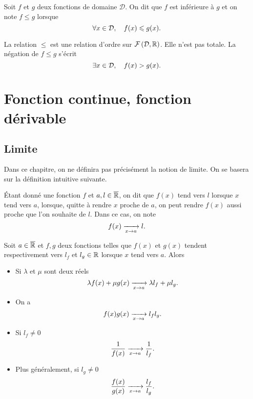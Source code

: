 \documentclass{magnoliaold}
\begin{document}
\begin{definition}[utile=-3]
Soit $f$ et $g$ deux fonctions de domaine $\mathcal{D}$.
On dit que $f$ est inférieure à $g$ et on note $f\leq g$ lorsque
\[\forall x\in\mathcal{D} ,\quad f(x)\leqslant g(x).\]
\end{definition}

\begin{remarques}
\remarque La relation $\leq$ est une relation d'ordre sur
  $\mathcal{F}\left(\mathcal{D},\mathbb{R}\right)$. Elle n'est pas totale.
\remarque La négation de $f\leq g$ s'écrit
  \[\exists x\in\mathcal{D} ,\quad f(x)> g(x).\]
\end{remarques}


\section{Fonction continue, fonction dérivable}

\subsection{Limite}

Dans ce chapitre, on ne définira pas précisément la notion de limite. On se basera sur la
définition intuitive suivante.

\begin{definition}[utile=-3]
Étant donné une fonction $f$ et $a,l\in\overline{\mathbb{R}}$, on dit que $f(x)$ tend vers
$l$ lorsque $x$ tend vers $a$, lorsque, quitte à rendre $x$ proche de $a$, on
peut rendre $f(x)$ aussi proche que l'on souhaite de $l$. Dans ce cas, on
note
$$f(x)\xrightarrow[x\rightarrow a]{}l.$$
\end{definition}

\begin{proposition}[utile=-3]
Soit $a\in\overline{\mathbb{R}}$ et $f, g$ deux fonctions telles que
$f(x)$ et $g(x)$ tendent respectivement vers $l_f$ et $l_g\in\mathbb{R}$ lorsque $x$
tend vers $a$. Alors
\begin{itemize}
\item Si $\lambda$ et $\mu$ sont deux réels
  \[\lambda f(x)+\mu g(x)\xrightarrow[x\rightarrow a]{} \lambda l_f+\mu l_g.\]
\item On a
  \[f(x)g(x) \xrightarrow[x\rightarrow a]{} l_f l_g.\]
\item Si $l_f\not=0$
  \[\frac{1}{f(x)}\xrightarrow[x\rightarrow a]{}\frac{1}{l_f}.\]
\item Plus généralement, si $l_g\not=0$
  \[\frac{f(x)}{g(x)}\xrightarrow[x\rightarrow a]{}\frac{l_f}{l_g}.\]
\end{itemize}
\end{proposition}
\end{document}
